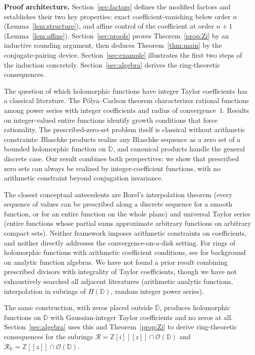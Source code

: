 \documentclass[12pt]{amsart}
\theoremstyle{definition}
\newcommand{\D}{\mathbb{D}}
\newcommand{\Z}{\mathbb{Z}}
\newcommand{\Zi}{\mathbb{Z}[i]}
\newcommand{\OD}{\mathcal{O}(\D)}
\newcommand{\mR}{\mathcal{R}}
\newcommand{\mRR}{\mathcal{R}_{\mathbb{R}}}
\begin{document}
\medskip\noindent\textbf{Proof architecture.}
Section~\ref{sec:factors} defines the modified factors and establishes
their two key properties: exact coefficient-vanishing below order $n$
(Lemma~\ref{lem:structure}), and affine control of the coefficient at
order $n+1$ (Lemma~\ref{lem:affine}).  Section~\ref{sec:proofs} proves
Theorem~\ref{prop:Zi} by an inductive rounding argument, then deduces
Theorem~\ref{thm:main} by the conjugate-pairing device.
Section~\ref{sec:example} illustrates the first two steps of the
induction concretely.  Section~\ref{sec:algebra} derives the
ring-theoretic consequences.

\medskip

The question of which holomorphic functions have integer Taylor
coefficients has a classical literature.  The Pólya--Carlson theorem
\cite{PC} characterizes rational functions among power series with
integer coefficients and radius of convergence~$1$.  Results on
integer-valued entire functions \cite{Gel} identify growth conditions
that force rationality.  The prescribed-zero-set problem itself is
classical without arithmetic constraints: Blaschke products realize
any Blaschke sequence as a zero set of a bounded holomorphic function
on $\D$, and canonical products \cite{Conway,Levin} handle the general
discrete case.  Our result combines both perspectives: we show that
prescribed zero sets can always be realized by integer-coefficient
functions, with no arithmetic constraint beyond conjugation invariance.

The closest conceptual antecedents are Borel's interpolation theorem
(every sequence of values can be prescribed along a discrete sequence
for a smooth function, or for an entire function on the whole plane)
and universal Taylor series (entire functions whose partial sums
approximate arbitrary functions on arbitrary compact sets).  Neither
framework imposes arithmetic constraints on coefficients, and neither
directly addresses the convergence-on-a-disk setting.  For rings of
holomorphic functions with arithmetic coefficient conditions, see
\cite{Stout} for background on analytic function algebras.  We have
not found a prior result combining prescribed divisors with
integrality of Taylor coefficients, though we have not exhaustively
searched all adjacent literatures (arithmetic analytic functions,
interpolation in subrings of $H(\D)$, random integer power series).

The same construction, with zeros placed outside $\overline{\D}$,
produces holomorphic functions on $\D$ with Gaussian-integer Taylor
coefficients and no zeros at all.  Section~\ref{sec:algebra} uses this
and Theorem~\ref{prop:Zi} to derive ring-theoretic consequences for
the subrings $\mR = \Zi[[z]] \cap \OD$ and $\mRR = \Z[[z]] \cap \OD$.
\end{document}
